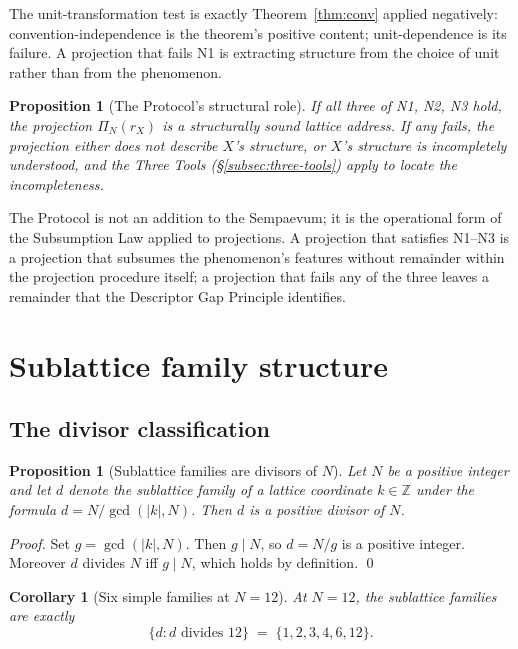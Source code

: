 \documentclass[11pt,a4paper]{article}
\newtheorem{corollary}[theorem]{Corollary}
\newtheorem{proposition}[theorem]{Proposition}
\theoremstyle{definition}
\theoremstyle{remark}
\newcommand{\Z}{\mathbb{Z}}
\begin{document}
The unit-transformation test is exactly Theorem~\ref{thm:conv} applied negatively: convention-independence is the theorem's positive content; unit-dependence is its failure. A projection that fails N1 is extracting structure from the choice of unit rather than from the phenomenon.

\begin{proposition}[The Protocol's structural role]\label{prop:N1N2N3-role}
If all three of N1, N2, N3 hold, the projection $\Pi_{N}(r_{X})$ is a structurally sound lattice address. If any fails, the projection either does not describe $X$'s structure, or $X$'s structure is incompletely understood, and the Three Tools (\S\ref{subsec:three-tools}) apply to locate the incompleteness.
\end{proposition}

The Protocol is not an addition to the Sempaevum; it is the operational form of the Subsumption Law applied to projections. A projection that satisfies N1--N3 is a projection that subsumes the phenomenon's features without remainder within the projection procedure itself; a projection that fails any of the three leaves a remainder that the Descriptor Gap Principle identifies.

\section{Sublattice family structure}\label{sec:sublattice}

\subsection{The divisor classification}

\begin{proposition}[Sublattice families are divisors of $N$]\label{prop:divisors}
Let $N$ be a positive integer and let $d$ denote the sublattice family of a lattice coordinate $k\in\Z$ under the formula $d=N/\gcd(|k|,N)$. Then $d$ is a positive divisor of $N$.
\end{proposition}

\begin{proof}
Set $g=\gcd(|k|,N)$. Then $g\mid N$, so $d = N/g$ is a positive integer. Moreover $d$ divides $N$ iff $g\mid N$, which holds by definition. \qed
\end{proof}

\begin{corollary}[Six simple families at $N=12$]\label{cor:six}
At $N=12$, the sublattice families are exactly
\[
\bigl\{d : d\text{ divides }12\bigr\} \;=\; \{1,2,3,4,6,12\}.
\]
\end{corollary}
\end{document}
